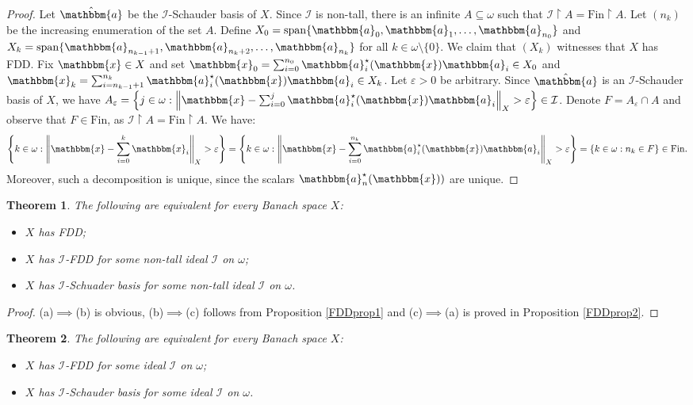 \documentclass{amsart}
\newcommand{\on}{\operatorname}
\newcommand{\I}{\mathcal{I}}
\newcommand{\Fin}{\mathrm{Fin}}
\newcommand{\w}{\mathbbm}
\newtheorem{theorem}{Theorem}[section]
\begin{document}
\begin{proof}
Let $\hat{\w{a}}$ be the $\I$-Schauder basis of $X$. Since $\I$ is non-tall, there is an infinite $A\subseteq\omega$ such that $\I\restriction A=\Fin\restriction A$. Let $(n_k)$ be the increasing enumeration of the set $A$. Define $X_0=\on{span}\{\w{a}_{0}, \w{a}_{1}, \ldots, \w{a}_{n_{0}}\}$ and $X_k= \on{span}\{\w{a}_{n_{k-1}+1}, \w{a}_{n_k +2}, \ldots, \w{a}_{n_{k}}\} $ for all $k\in\omega\setminus\{0\}$. We claim that $(X_k)$ witnesses that $X$ has FDD. Fix $\w{x}\in X$ and set $\w{x}_0=\sum_{i=0}^{n_{0}}\w{a}^\star_i(\w{x})\w{a}_i\in X_0$ and $\w{x}_k=\sum_{i=n_{k-1}+1}^{n_{k}}\w{a}^\star_i(\w{x})\w{a}_i\in X_k$. Let $\varepsilon>0$ be arbitrary. Since $\hat{\w{a}}$ is an $\I$-Schauder basis of $X$, we have $A_\varepsilon=\left\{j\in \omega: \left\|\w{x}-\sum_{i=0}^{j} \w{a}^\star_i(\w{x})\w{a}_i\right\|_X>\varepsilon \right\}\in\I$. Denote $F=A_\varepsilon\cap A$ and observe that $F\in\Fin$, as $\I\restriction A=\Fin\restriction A$. We have:
\[
\left\{k\in\omega: \left\|\w{x}-\sum_{i=0}^k \w{x}_i\right\|_X>\varepsilon \right\}=\left\{k\in\omega: \left\|\w{x}-\sum_{i=0}^{n_k} \w{a}^\star_i(\w{x})\w{a}_i\right\|_X>\varepsilon \right\}=\left\{k\in\omega:n_k\in F\right\}\in\Fin.
\]
Moreover, such a decomposition is unique, since the scalars $\w{a}^\star_n(\w{x}))$ are unique.
\end{proof}


\begin{theorem}
The following are equivalent for every Banach space $X$:
    \begin{itemize}
        \item[(a)] $X$ has FDD;
        \item[(b)] $X$ has $\I$-FDD for some non-tall ideal $\I$ on $\omega$;
        \item[(c)] $X$ has $\I$-Schuader basis for some non-tall ideal $\I$ on $\omega$. 
    \end{itemize}
\end{theorem}

\begin{proof}
(a)$\implies$(b) is obvious, (b)$\implies$(c) follows from Proposition \ref{FDDprop1} and (c)$\implies$(a) is proved in Proposition \ref{FDDprop2}.
\end{proof}

\begin{theorem}
The following are equivalent for every Banach space $X$:
    \begin{itemize}
        \item[(a)] $X$ has $\I$-FDD for some ideal $\I$ on $\omega$;
        \item[(b)] $X$ has $\I$-Schauder basis for some ideal $\I$ on $\omega$. 
    \end{itemize}
\end{theorem}
\end{document}
